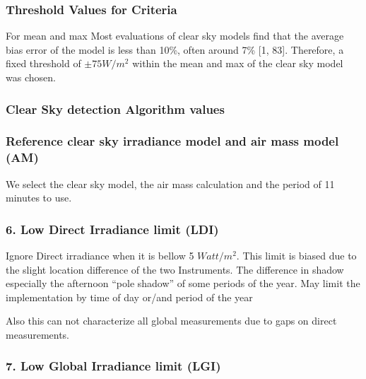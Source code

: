 \documentclass[
  10pt,
  a4paper,oneside]{article}
\begin{document}
\hypertarget{threshold-values-for-criteria}{%
\subsubsection{Threshold Values for Criteria}\label{threshold-values-for-criteria}}

For mean and max Most evaluations of clear sky models find that the average
bias error of the model is less than 10\%, often around 7\% {[}1, 83{]}. Therefore,
a fixed threshold of \(\pm 75 W / m^2\) within the mean and max of the clear sky model
was chosen.

\hypertarget{clear-sky-detection-algorithm-values}{%
\subsubsection{Clear Sky detection Algorithm values}\label{clear-sky-detection-algorithm-values}}

\hypertarget{reference-clear-sky-irradiance-model-and-air-mass-model-am}{%
\subsubsection{Reference clear sky irradiance model and air mass model (AM)}\label{reference-clear-sky-irradiance-model-and-air-mass-model-am}}

We select the clear sky model, the air mass calculation
and the period of 11 minutes to use.

\hypertarget{low-direct-irradiance-limit-ldi}{%
\subsubsection{6. Low Direct Irradiance limit (LDI)}\label{low-direct-irradiance-limit-ldi}}

Ignore Direct irradiance when it is bellow 5 \(Watt/m^2\).
This limit is biased due to the slight location difference of the two Instruments.
The difference in shadow especially the afternoon ``pole shadow'' of some periods of the year.
May limit the implementation by time of day or/and period of the year

Also this can not characterize all global measurements due to gaps on direct measurements.

\hypertarget{low-global-irradiance-limit-lgi}{%
\subsubsection{7. Low Global Irradiance limit (LGI)}\label{low-global-irradiance-limit-lgi}}
\end{document}
